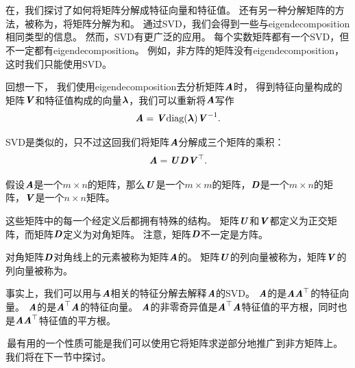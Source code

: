 \section{}
\label{sec:singular_value_decomposition}

在，我们探讨了如何将矩阵分解成特征向量和特征值。
还有另一种分解矩阵的方法，被称为，将矩阵分解为和。
通过\gls{SVD}，我们会得到一些与\gls{eigendecomposition}相同类型的信息。
然而，\gls{SVD}有更广泛的应用。
每个实数矩阵都有一个\gls{SVD}，但不一定都有\gls{eigendecomposition}。
例如，非方阵的矩阵没有\gls{eigendecomposition}，这时我们只能使用\gls{SVD}。


回想一下， 我们使用\gls{eigendecomposition}去分析矩阵$\MA$时， 得到特征向量构成的矩阵$\MV$和特征值构成的向量$\Vlambda$，我们可以重新将$\MA$写作
\begin{equation}
    \MA=\MV\text{diag}(\Vlambda)\MV^{-1}.
\end{equation}

\gls{SVD}是类似的，只不过这回我们将矩阵$\MA$分解成三个矩阵的乘积：
\begin{equation}
    \MA=\MU\MD\MV^\top.
\end{equation}


假设$\MA$是一个$m\times n$的矩阵，那么$\MU$是一个$m\times m$的矩阵，$\MD$是一个$m\times n$的矩阵，$\MV$是一个$n\times n$矩阵。



这些矩阵中的每一个经定义后都拥有特殊的结构。
矩阵$\MU$和$\MV$都定义为正交矩阵，而矩阵$\MD$定义为对角矩阵。
注意，矩阵$\MD$不一定是方阵。


对角矩阵$\MD$对角线上的元素被称为矩阵$\MA$的。
矩阵$\MU$的列向量被称为，矩阵$\MV$的列向量被称为。


事实上，我们可以用与$\MA$相关的特征分解去解释$\MA$的\gls{SVD}。
$\MA$的是$\MA\MA^\top$的特征向量。
$\MA$的是$\MA^\top\MA$的特征向量。
$\MA$的非零奇异值是$\MA^\top\MA$特征值的平方根，同时也是$\MA\MA^\top$特征值的平方根。


\,最有用的一个性质可能是我们可以使用它将矩阵求逆部分地推广到非方矩阵上。我们将在下一节中探讨。




\section{}
\label{sec:the_moore_penrose_pseudoinverse}


